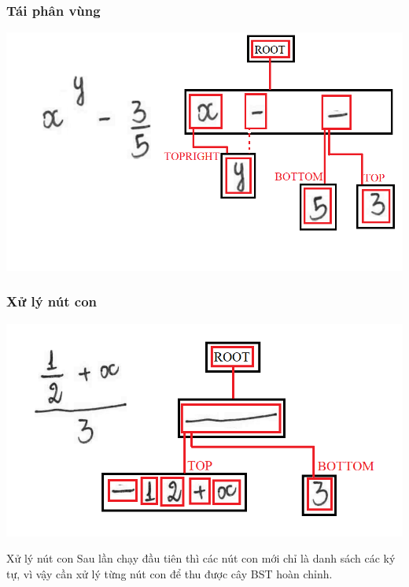 \documentclass{beamer}
\begin{document}
\begin{frame}
	\frametitle{Tái phân vùng}
	\begin{center}
		\centering
		\includegraphics[width=0.6\linewidth]{hor8.png}
	\end{center}
\end{frame}

\begin{frame}
	\frametitle{Xử lý nút con}
	\begin{center}
		\centering
		\includegraphics[width=0.75\linewidth]{UN.png}
	\end{center}
	\begin{block}{Xử lý nút con}
		Sau lần chạy đầu tiên thì các nút con mới chỉ là danh sách các ký tự, vì vậy cần xử lý từng nút con để thu được cây BST hoàn chỉnh.
	\end{block}
\end{frame}
\end{document}
